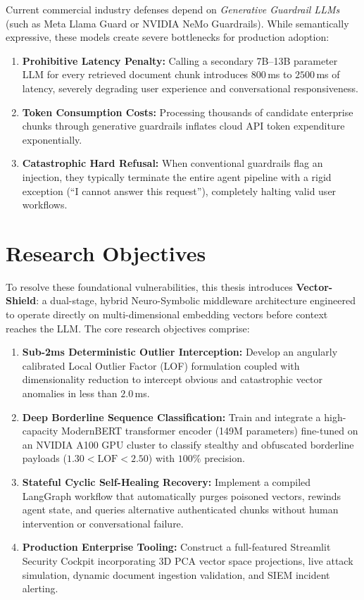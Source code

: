 Current commercial industry defenses depend on \textit{Generative Guardrail LLMs} (such as Meta Llama Guard \cite{inan2023llama} or NVIDIA NeMo Guardrails). While semantically expressive, these models create severe bottlenecks for production adoption:
\begin{enumerate}
    \item \textbf{Prohibitive Latency Penalty:} Calling a secondary 7B--13B parameter LLM for every retrieved document chunk introduces $800$\,ms to $2500$\,ms of latency, severely degrading user experience and conversational responsiveness.
    \item \textbf{Token Consumption Costs:} Processing thousands of candidate enterprise chunks through generative guardrails inflates cloud API token expenditure exponentially.
    \item \textbf{Catastrophic Hard Refusal:} When conventional guardrails flag an injection, they typically terminate the entire agent pipeline with a rigid exception (\enquote{I cannot answer this request}), completely halting valid user workflows.
\end{enumerate}

\section{Research Objectives}
To resolve these foundational vulnerabilities, this thesis introduces \textbf{Vector-Shield}: a dual-stage, hybrid Neuro-Symbolic middleware architecture engineered to operate directly on multi-dimensional embedding vectors before context reaches the LLM. The core research objectives comprise:
\begin{enumerate}
    \item \textbf{Sub-2ms Deterministic Outlier Interception:} Develop an angularly calibrated Local Outlier Factor (LOF) formulation coupled with dimensionality reduction to intercept obvious and catastrophic vector anomalies in less than $2.0$\,ms.
    \item \textbf{Deep Borderline Sequence Classification:} Train and integrate a high-capacity ModernBERT transformer encoder (149M parameters) fine-tuned on an NVIDIA A100 GPU cluster to classify stealthy and obfuscated borderline payloads ($1.30 < \text{LOF} < 2.50$) with $100\%$ precision.
    \item \textbf{Stateful Cyclic Self-Healing Recovery:} Implement a compiled LangGraph workflow that automatically purges poisoned vectors, rewinds agent state, and queries alternative authenticated chunks without human intervention or conversational failure.
    \item \textbf{Production Enterprise Tooling:} Construct a full-featured Streamlit Security Cockpit incorporating 3D PCA vector space projections, live attack simulation, dynamic document ingestion validation, and SIEM incident alerting.
\end{enumerate}

